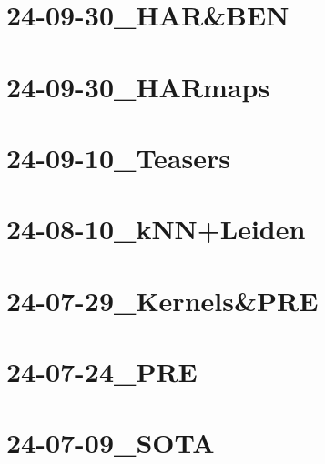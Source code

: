 \documentclass[11pt]{article}
\begin{document}
\clearpage

\tableofcontents


\clearpage

\section{24-09-30\_HAR\&BEN}

\section{24-09-30\_HARmaps}

\section{24-09-10\_Teasers}

\section{24-08-10\_kNN+Leiden}

\section{24-07-29\_Kernels\&PRE}

\section{24-07-24\_PRE}

\section{24-07-09\_SOTA}


\printbibliography
\end{document}
